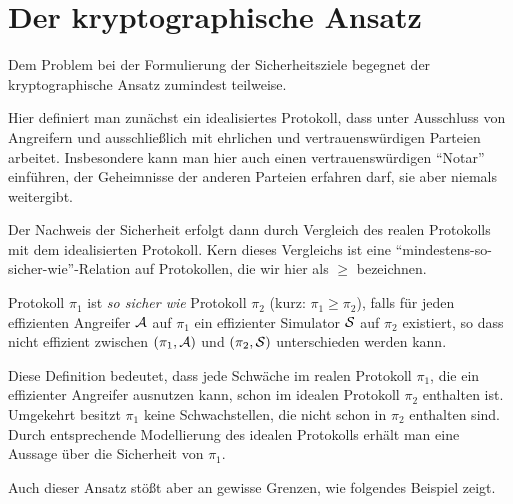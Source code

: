 \section{Der kryptographische Ansatz}

Dem Problem bei der Formulierung der Sicherheitsziele begegnet der kryptographische Ansatz zumindest teilweise.

Hier definiert man zunächst ein idealisiertes Protokoll, dass unter Ausschluss von Angreifern und ausschließlich mit ehrlichen und vertrauenswürdigen Parteien arbeitet.
Insbesondere kann man hier auch einen vertrauenswürdigen "`Notar"' einführen, der Geheimnisse der anderen Parteien erfahren darf, sie aber niemals weitergibt.

Der Nachweis der Sicherheit erfolgt dann durch Vergleich des realen Protokolls mit dem idealisierten Protokoll. Kern dieses Vergleichs ist eine "`mindestens-so-sicher-wie"'-Relation auf Protokollen, die wir hier als $\geq$ bezeichnen.\\

\begin{definition}
    Protokoll $\pi_1$ ist \emph{so sicher wie} Protokoll $\pi_2$ (kurz: $\pi_1 \geq \pi_2$), falls
    für jeden effizienten Angreifer $\mathcal{A}$ auf $\pi_1$
    ein effizienter Simulator $\mathcal{S}$ auf $\pi_2$ existiert, so dass
    nicht effizient zwischen $(\pi_1,\mathcal{A})$ und $(\pi_2,\mathcal{S})$
    unterschieden werden kann.
\end{definition}

Diese Definition bedeutet, dass jede Schwäche im realen Protokoll $\pi_1$, die ein effizienter Angreifer ausnutzen kann, schon im idealen Protokoll $\pi_2$ enthalten ist.
Umgekehrt besitzt $\pi_1$ keine Schwachstellen, die nicht schon in $\pi_2$ enthalten sind.
Durch entsprechende Modellierung des idealen Protokolls erhält man eine Aussage über die Sicherheit von $\pi_1$.

Auch dieser Ansatz stößt aber an gewisse Grenzen, wie folgendes Beispiel zeigt.\\

